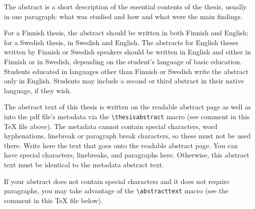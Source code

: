 \documentclass[english, 12pt, a4paper, elec, utf8, a-2b, online]{aaltothesis}
\date{19 February 2026}
\begin{document}
\makecoverpage

\makecopyrightpage

\clearpage

\begin{abstractpage}[english]
  The abstract is a short description of the essential contents of the thesis,
usually in one paragraph: what was studied and how and what were the main
findings.

For a Finnish thesis, the abstract should be written in both Finnish and
English; for a Swedish thesis, in Swedish and English. The abstracts for
English theses written by Finnish or Swedish speakers should be written in
English and either in Finnish or in Swedish, depending on the student’s
language of basic education. Students educated in languages other than Finnish
or Swedish write the abstract only in English. Students may include a second
or third abstract in their native language, if they wish.

The abstract text of this thesis is written on the readable abstract page as
well as into the pdf file's metadata via the \verb+\thesisabstract+ macro
(see comment in this \TeX{} file above). The metadata cannot contain special 
characters, word hyphenations, linebreak or paragraph break characters, so 
these must not be used there. Write here the text that goes onto the readable 
abstract page. You can have special characters, linebreaks, and paragraphs 
here. Otherwise, this abstract text must be identical to the metadata abstract 
text.

If your abstract does not contain special characters and it does not require
paragraphs, you may take advantage of the \verb+\abstracttext+ macro (see the
comment in this \TeX{} file below).
\end{abstractpage}
\end{document}
